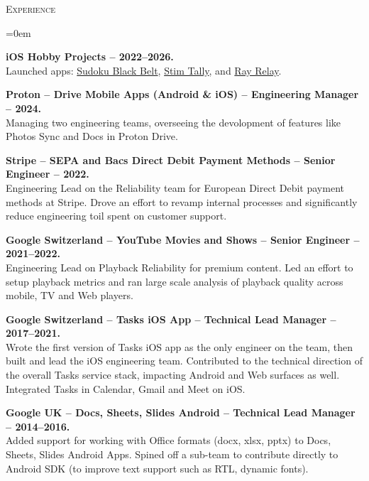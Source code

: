 \documentclass[11pt]{article}
\begin{document}
\vspace{0.12in}
\noindent
\textcolor{Primary}{{\large \textsc{Experience}}}
\begin{list}{}{\leftmargin=0em}

\item
{\bf iOS Hobby Projects -- 2022--2026.}\\
Launched apps: \href{https://apps.apple.com/us/app/sudoku-black-belt/id1639802667}{Sudoku Black Belt},
\href{https://apps.apple.com/us/app/stim-tally/id6444342899}{Stim Tally}, and
\href{https://apps.apple.com/us/app/ray-relay/id6769096423}{Ray Relay}.

\item
{\bf Proton -- Drive Mobile Apps (Android \& iOS) -- Engineering Manager -- 2024.}\\
Managing two engineering teams, overseeing the devolopment of features like Photos Sync and Docs in Proton Drive.

\item
{\bf Stripe -- SEPA and Bacs Direct Debit Payment Methods -- Senior Engineer -- 2022.}\\
Engineering Lead on the Reliability team for European Direct Debit payment methods at Stripe.
Drove an effort to revamp internal processes and significantly reduce engineering toil spent on customer support.
  
\item
{\bf Google Switzerland -- YouTube Movies and Shows -- Senior Engineer -- 2021--2022.}\\
Engineering Lead on Playback Reliability for premium content. Led an effort to setup playback metrics and ran large scale analysis of playback quality across mobile, TV and Web players.

\item
{\bf Google Switzerland -- Tasks iOS App -- Technical Lead Manager -- 2017--2021.}\\
Wrote the first version of Tasks iOS app as the only engineer on the team, then built and lead the iOS engineering team.
Contributed to the technical direction of the overall Tasks service stack, impacting Android and Web surfaces
as well. Integrated Tasks in Calendar, Gmail and Meet on iOS.
  
\item
{\bf Google UK -- Docs, Sheets, Slides Android -- Technical Lead Manager -- 2014--2016.}\\
Added support for working with Office formats (docx, xlsx, pptx) to Docs, Sheets, Slides Android Apps. Spined off a
sub-team to contribute directly to Android SDK (to improve text support such as RTL, dynamic fonts). 


\end{list}
\end{document}
